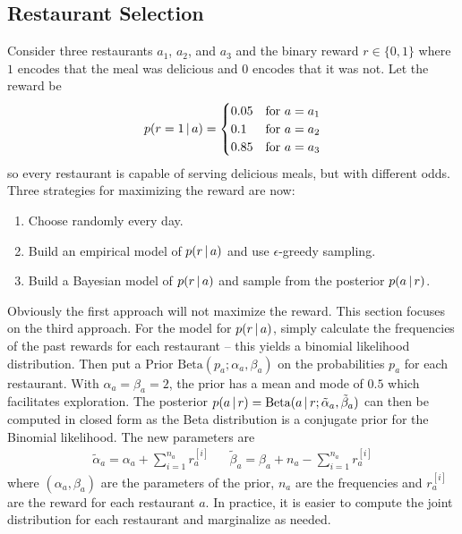 		\subsection{Restaurant Selection}
			Consider three restaurants \(a_1\), \(a_2\), and \(a_3\) and the binary reward \( r \in \{ 0, 1 \} \) where \(1\) encodes that the meal was delicious and \(0\) encodes that it was not. Let the reward be
			\begin{equation*}
				p(r = 1 \,\vert\, a) =
					\begin{cases}
						0.05 & \text{for } a = a_1 \\
						0.1  & \text{for } a = a_2 \\
						0.85 & \text{for } a = a_3
					\end{cases}
			\end{equation*}
			so every restaurant is capable of serving delicious meals, but with different odds. Three strategies for maximizing the reward are now:
			\begin{enumerate}
				\item Choose randomly every day.
				\item Build an empirical model of \( p(r \,\vert\, a) \) and use \(\epsilon\)-greedy sampling.
				\item Build a Bayesian model of \( p(r \,\vert\, a) \) and sample from the posterior \( p(a \,\vert\, r) \).
			\end{enumerate}
			Obviously the first approach will not maximize the reward. This section focuses on the third approach. For the model for \( p(r \,\vert\, a) \), simply calculate the frequencies of the past rewards for each restaurant -- this yields a binomial likelihood distribution. Then put a Prior \( \mathrm{Beta}(p_a; \alpha_a, \beta_a) \) on the probabilities \( p_a \) for each restaurant. With \( \alpha_a = \beta_a = 2 \), the prior has a mean and mode of \(0.5\) which facilitates exploration. The posterior \( p(a \,\vert\, r) = \mathrm{Beta}(a \,\vert\, r; \tilde{\alpha}_a, \tilde{\beta}_a) \) can then be computed in closed form as the Beta distribution is a conjugate prior for the Binomial likelihood. The new parameters are
			\begin{align*}
				\tilde{\alpha}_a = \alpha_a + \sum_{i = 1}^{n_a} r_a^{[i]}
				&&
				\tilde{\beta}_a = \beta_a + n_a - \sum_{i = 1}^{n_a} r_a^{[i]}
			\end{align*}
			where \( (\alpha_a, \beta_a) \) are the parameters of the prior, \(n_a\) are the frequencies and \(r_a^{[i]}\) are the reward for each restaurant \(a\). In practice, it is easier to compute the joint distribution for each restaurant and marginalize as needed.

